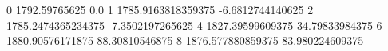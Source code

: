 0 1792.59765625 0.0
1 1785.9163818359375 -6.6812744140625
2 1785.2474365234375 -7.3502197265625
4 1827.39599609375 34.79833984375
6 1880.90576171875 88.30810546875
8 1876.577880859375 83.980224609375
